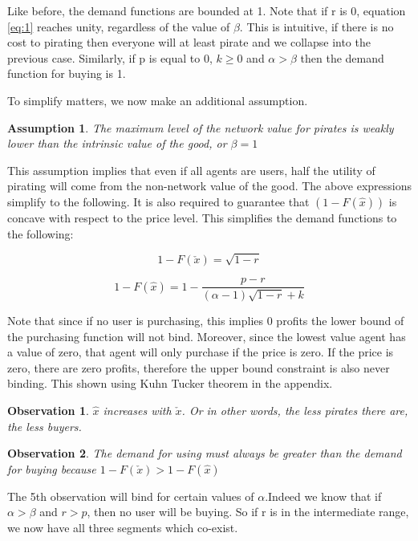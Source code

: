 \documentclass{article}
\newtheorem{observation}{Observation}
\newtheorem{assumption}{Assumption}
\begin{document}
Like before, the demand functions are bounded at 1. Note that if r is 0, equation \ref{eq:1} reaches unity, regardless of the value of $\beta$. This is intuitive, if there is no cost to pirating then everyone will at least pirate and we collapse into the previous case. Similarly, if p is equal to 0, $k \geq 0$ and $\alpha>\beta$ then the demand function for buying is 1. 

To simplify matters, we now make an additional assumption. 

\begin{assumption}
The maximum level of the network value for pirates is weakly lower than the intrinsic value of the good, or $\beta=1$
\end{assumption}

This assumption implies that even if all agents are users, half the utility of pirating will come from the non-network value of the good. The above expressions simplify to the following. It is also required to guarantee that $(1-F(\hat{x}))$ is concave with respect to the price level. This simplifies the demand functions to the following:

\begin{equation}\label{eq:3}
1 - F(\check{x}) = \sqrt{1-r}
\end{equation}

\begin{equation}\label{eq:4}
1 - F(\hat{x})= 1 - \frac{p-r}{(\alpha - 1) \sqrt{1-r} +k}
\end{equation}

Note that since if no user is purchasing, this implies 0 profits the lower bound of the purchasing function will not bind. Moreover, since the lowest value agent has a value of zero, that agent will only purchase if the price is zero. If the price is zero, there are zero profits, therefore the upper bound constraint is also never binding. This shown using Kuhn Tucker theorem in the appendix. 

\begin{observation}
$\hat{x}$ increases with $\check{x}$. Or in other words, the less pirates there are, the less buyers.
\end{observation}

\begin{observation}
The demand for using must always be greater than the demand for buying because  
$1-F(\check{x})> 1-F(\hat{x})$
\end{observation}

The 5th observation will bind for certain values of $\alpha$.Indeed we know that if $\alpha>\beta$ and $r>p$, then no user will be buying. So if r is in the intermediate range, we now have all three segments which co-exist.  
\end{document}
